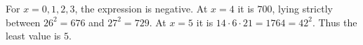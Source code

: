 For $x=0,1,2,3$, the expression is negative. At $x=4$ it is $700$, lying strictly between $26^2=676$ and $27^2=729$. At $x=5$ it is $14\cdot6\cdot21=1764=42^2$. Thus the least value is $\boxed5$.
